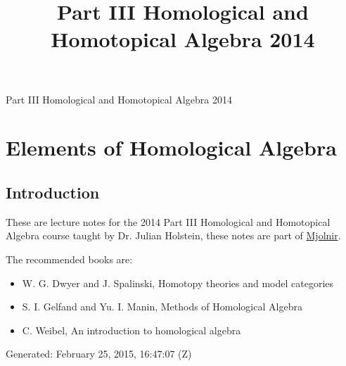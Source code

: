 \documentclass[10pt,]{book}
\title{Part III Homological and Homotopical Algebra 2014}
\author{}
\date{}
\theoremstyle{plain}
\theoremstyle{definition}
\numberwithin{equation}{section}
\begin{document}
\frontmatter
\thispagestyle{empty}
\begin{center}
{\Huge Part III Homological and Homotopical Algebra 2014}
\end{center}\par
{}
\clearpage
\thispagestyle{empty}
\clearpage
\maketitle
\clearpage
\thispagestyle{empty}
\clearpage
\setcounter{tocdepth}{1}
\renewcommand*\contentsname{Contents}
\tableofcontents
\mainmatter
\typeout{************************************************}
\typeout{************************************************}
\chapter[Elements of Homological Algebra]{Elements of Homological Algebra}\label{chap-hom-alg}
\typeout{************************************************}
\typeout{************************************************}
\section[Introduction]{Introduction}\label{sec-introduction}
These are lecture notes for the 2014 Part III Homological and Homotopical Algebra course taught by Dr. Julian Holstein, these notes are part of \href{https://alexjbest.github.io/mjolnir/}{Mjolnir}.%
\par
The recommended books are: 
          \begin{itemize}
\item{}W. G. Dwyer and J. Spalinski, Homotopy theories and model categories\item{}S. I. Gelfand and Yu. I. Manin, Methods of Homological Algebra\item{}C. Weibel, An introduction to homological algebra\end{itemize}

\par

          Generated: February 25, 2015, 16:47:07 (Z)
\typeout{************************************************}
\typeout{************************************************}
\end{document}
